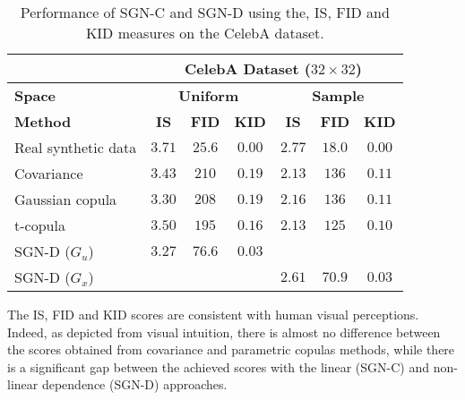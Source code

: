 \begin{table}[]
\centering
\begin{tabular}{l|c|c|c|c|c|c|}
\cline{2-7}
                                          & \multicolumn{6}{c|}{\textbf{CelebA Dataset ($32\times 32$)}} \\ \hline

\multicolumn{1}{|l|}{\textbf{Space}}     & \multicolumn{3}{c|}{\textbf{Uniform}}       & \multicolumn{3}{c|}{\textbf{Sample}}      \\ \hline \hline                                      
                                          
\multicolumn{1}{|l|}{\textbf{Method}}     & \textbf{IS}  & \textbf{FID} & \textbf{KID} & \textbf{IS} & \textbf{FID} & \textbf{KID}     \\ \hline \hline

\multicolumn{1}{|l|}{Real synthetic data} & $3.71$ & $25.6$     & $0.00$ &  $2.77$                    & $18.0$ & $0.00$ \\ \hline \hline
\multicolumn{1}{|l|}{Covariance}         & $3.43$ & $210$     & $0.19$ & $2.13$                    & $136$ & $0.11$                        \\ \hline
\multicolumn{1}{|l|}{Gaussian copula}    & $3.30$ & $208$     & $0.19$ & $2.16$                    & $136$ & $0.11$                        \\ \hline
\multicolumn{1}{|l|}{t-copula}            & $3.50$ & $195$     & $0.16$ & $2.13$                    & $125$ & $0.10$ \\ \hline \hline
\multicolumn{1}{|l|}{SGN-D ($G_u$)}         & $3.27$ & $76.6$     & $0.03$ &  &  &  \\ \hline
\multicolumn{1}{|l|}{SGN-D ($G_x$)}         &  &      &  & $2.61$                    & $70.9$ & $0.03$ \\ \hline 
\end{tabular}
\caption{Performance of SGN-C and SGN-D using the, IS, FID and KID measures on the CelebA dataset.}
\label{tab:InceptionScores}
\end{table}

The IS, FID and KID scores are consistent with human visual perceptions. Indeed, as depicted from visual intuition, there is almost no difference between the scores obtained from covariance and parametric copulas methods, while there is a significant gap between the achieved scores with the linear (SGN-C) and non-linear dependence (SGN-D) approaches.

